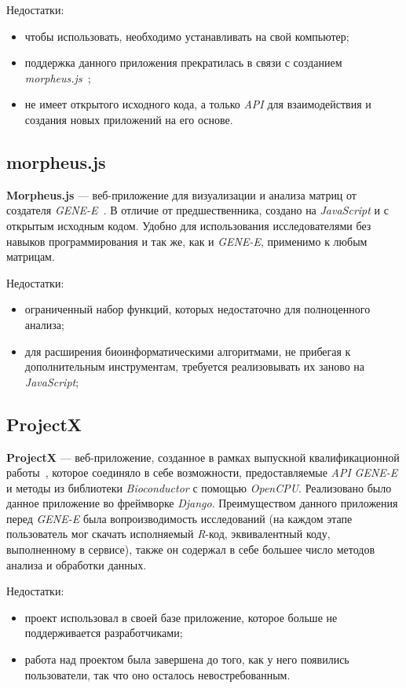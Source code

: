 \documentclass[annotation,specification]{itmo-student-thesis}
\begin{document}
Недостатки:
\begin{itemize}
\item чтобы использовать, необходимо устанавливать на свой компьютер;
\item поддержка данного приложения прекратилась в связи с созданием \emph{morpheus.js}~\cite{morpheus};
\item не имеет открытого исходного кода, а только \emph{API} для взаимодействия и создания новых приложений на его основе.
\end{itemize}

\subsection{morpheus.js}
\textbf{Morpheus.js} --- веб-приложение для визуализации и анализа матриц от создателя \emph{GENE-E}~\cite{morpheus}. В отличие от предшественника, создано на \emph{JavaScript} и с открытым исходным кодом. Удобно для использования исследователями без навыков программирования и так же, как и \emph{GENE-E}, применимо к любым матрицам.

Недостатки:
\begin{itemize}
\item ограниченный набор функций, которых недостаточно для полноценного анализа;
\item для расширения биоинформатическими алгоритмами, не прибегая к дополнительным инструментам, требуется реализовывать их заново на \emph{JavaScript};
\end{itemize}

\subsection{ProjectX}
\textbf{ProjectX} --- веб-приложение, созданное в рамках выпускной квалификационной работы~\cite{projectx}, которое соединяло в себе возможности, предоставляемые \emph{API} \emph{GENE-E} и методы из библиотеки \emph{Bioconductor} с помощью \emph{OpenCPU}. Реализовано было данное приложение во фреймворке \emph{Django}. Преимуществом данного приложения перед \emph{GENE-E} была вопроизводимость исследований (на каждом этапе пользователь мог скачать исполняемый \emph{R}-код, эквивалентный коду, выполненному в сервисе), также он содержал в себе большее число методов анализа и обработки данных.

Недостатки:
\begin{itemize}
\item проект использовал в своей базе приложение, которое больше не поддерживается разработчиками;
\item работа над проектом была завершена до того, как у него появились пользователи, так что оно осталось невостребованным.
\end{itemize}
\end{document}
